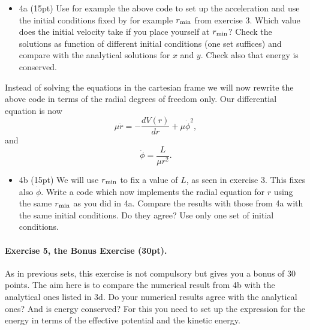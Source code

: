 \documentclass[%
oneside,                 %
final,                   %
10pt]{article}
\begin{document}
\epycod

\begin{itemize}
\item 4a (15pt) Use for example the above code to set up the acceleration and use the initial conditions fixed by for example $r_{\rm min}$ from exercise 3. Which value does the initial velocity take if you place yourself at $r_{\rm min}$?  Check the solutions as function of  different initial conditions (one set suffices) and compare with the analytical solutions for $x$ and $y$. Check also that energy is conserved.
\end{itemize}

\noindent
Instead of solving the equations in the cartesian frame we will now rewrite the above code in terms of the radial degrees of freedom only. Our differential equation is now
\[
\mu \ddot{r}=-\frac{dV(r)}{dr}+\mu\dot{\phi}^2,
\]
and
\[
\dot{\phi}=\frac{L}{\mu r^2}.
\]

\begin{itemize}
\item 4b (15pt) We will use $r_{\rm min}$ to fix a value of $L$, as seen in exercise 3. This fixes also $\dot{\phi}$. Write a code which now implements the radial equation for $r$ using the same $r_{\rm min}$ as you did in 4a. Compare the results with those from 4a with the same initial conditions. Do they agree? Use only one set of initial conditions.
\end{itemize}

\noindent
\paragraph{Exercise 5, the Bonus Exercise (30pt).}
As in previous sets, this exercise is not compulsory but gives you a bonus of 30 points.
The aim here is to compare the numerical result from 4b with the analytical ones  listed in 3d. Do your numerical results agree with the analytical ones?  And is energy conserved?  For this you need to set up the expression for the energy in terms of the effective potential and the kinetic energy.


\end{document}

